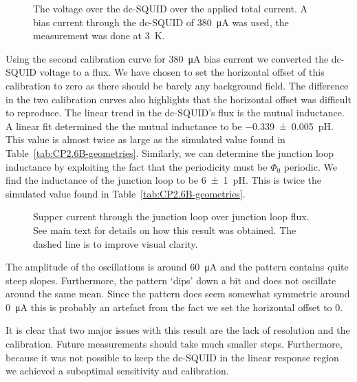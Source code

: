 \begin{figure}[ht!]
	\centering
	
	\caption{The voltage over the dc-SQUID over the applied total current. A bias current through the dc-SQUID of \qty{380}{\micro\ampere} was used, the measurement was done at \qty{3}{\kelvin}.}
	\label{fig:CP2.6B_SQUID_voltage_over_total_current}
\end{figure}

Using the second calibration curve for \qty{380}{\micro\ampere} bias current we converted the dc-SQUID voltage to a flux. We have chosen to set the horizontal offset of this calibration to zero as there should be barely any background field. The difference in the two calibration curves also highlights that the horizontal offset was difficult to reproduce. The linear trend in the dc-SQUID's flux is the mutual inductance. A linear fit determined the the mutual inductance to be \qty{-0.339\pm0.005}{\pico\henry}. This value is almost twice as large as the simulated value found in Table~\ref{tab:CP2.6B-geometries}. Similarly, we can determine the junction loop inductance by exploiting the fact that the periodicity must be $\Phi_0$ periodic. We find the inductance of the junction loop to be \qty{6\pm1}{\pico\henry}. This is twice the simulated value found in Table~\ref{tab:CP2.6B-geometries}.

\begin{figure}[ht!]
	\centering
	
	\caption{Supper current through the junction loop over junction loop flux. See main text for details on how this result was obtained. The dashed line is to improve visual clarity.}
	\label{fig:CP2.6B_super_current_over_loop_flux}
\end{figure}

The amplitude of the oscillations is around \qty{60}{\micro\ampere} and the pattern contains quite steep slopes. Furthermore, the pattern `dips' down a bit and does not oscillate around the same mean. Since the pattern does seem somewhat symmetric around \qty{0}{\micro\ampere} this is probably an artefact from the fact we set the horizontal offset to 0.

It is clear that two major issues with this result are the lack of resolution and the calibration. Future measurements should take much smaller steps. Furthermore, because it was not possible to keep the dc-SQUID in the linear response region we achieved a suboptimal sensitivity and calibration.